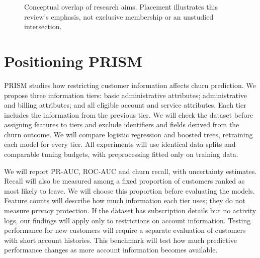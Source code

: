 \documentclass[sigconf,nonacm]{acmart}
\begin{document}
\begin{figure}[t]
\centering
{}
\caption{Conceptual overlap of research aims. Placement illustrates this review's emphasis, not exclusive membership or an unstudied intersection.}
\label{fig:venn}
\end{figure}

\section{Positioning PRISM}
PRISM studies how restricting customer information affects churn prediction. We propose three information tiers: basic administrative attributes; administrative and billing attributes; and all eligible account and service attributes. Each tier includes the information from the previous tier. We will check the dataset before assigning features to tiers and exclude identifiers and fields derived from the churn outcome. We will compare logistic regression and boosted trees, retraining each model for every tier. All experiments will use identical data splits and comparable tuning budgets, with preprocessing fitted only on training data.

We will report PR-AUC, ROC-AUC and churn recall, with uncertainty estimates. Recall will also be measured among a fixed proportion of customers ranked as most likely to leave. We will choose this proportion before evaluating the models. Feature counts will describe how much information each tier uses; they do not measure privacy protection. If the dataset has subscription details but no activity logs, our findings will apply only to restrictions on account information. Testing performance for new customers will require a separate evaluation of customers with short account histories. This benchmark will test how much predictive performance changes as more account information becomes available.
\end{document}
